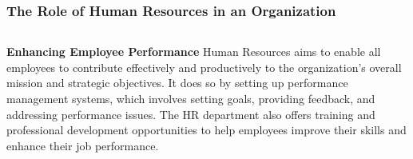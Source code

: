 \documentclass[5pt]{beamer}
\begin{document}
\begin{frame}
\frametitle{The Role of Human Resources in an Organization}
\begin{columns}
\begin{column}{0.7\textwidth}
\begin{block}{\textbf{Enhancing Employee Performance}}
Human Resources aims to enable all employees to contribute effectively and productively to the organization's overall mission and strategic objectives. It does so by setting up performance management systems, which involves setting goals, providing feedback, and addressing performance issues. The HR department also offers training and professional development opportunities to help employees improve their skills and enhance their job performance.
\end{block}
\end{column}
\end{columns}
\end{frame}
\end{document}
